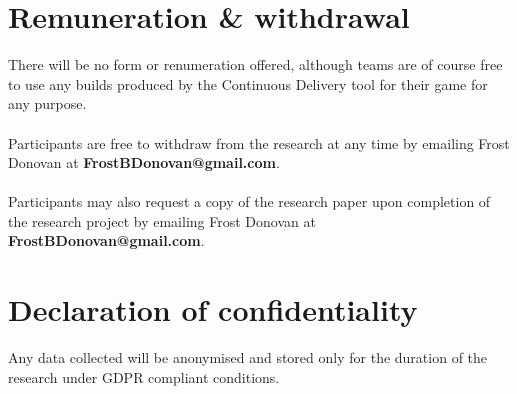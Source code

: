 \documentclass{article}
\begin{document}

    \section{Remuneration \& withdrawal}
        There will be no form or renumeration offered, although teams are of course free to use any builds produced by the Continuous Delivery tool for their game for any purpose.
        \\ \\
        Participants are free to withdraw from the research at any time by emailing Frost Donovan at \textbf{FrostBDonovan@gmail.com}. 
        \\ \\
        Participants may also request a copy of the research paper upon completion of the research project by emailing Frost Donovan at \textbf{FrostBDonovan@gmail.com}.
        
    \section{Declaration of confidentiality}
        Any data collected will be anonymised and stored only for the duration of the research under GDPR compliant conditions.





\end{document}
